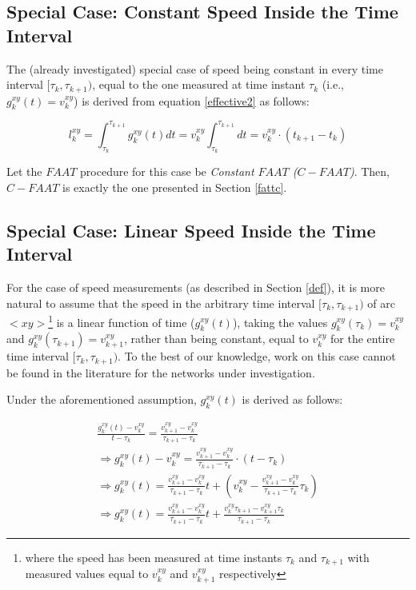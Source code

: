 \documentclass[conference]{IEEEtran}
\begin{document}
\subsection{Special Case: Constant Speed Inside the Time Interval} 

The (already investigated) special case of speed being constant in every time interval $[\tau_k, \tau_{k+1})$, equal to the one measured at time instant $\tau_k$ (i.e., $g_k^{xy}(t)=v_k^{xy}$) is derived from equation \ref{effective2} as follows:

\begin{equation}
    l_k^{xy}=\int_{\tau_k}^{\tau_{k+1}}g_k^{xy}(t)dt=v_k^{xy} \int_{\tau_k}^{\tau_{k+1}}dt=v_k^{xy}\cdot(t_{k+1}-t_k)    \label{effective3}
\end{equation}

Let the $FAAT$ procedure for this case be \emph{Constant $FAAT$ ($C-FAAT$)}. Then, $C-FAAT$ is exactly the one presented in Section \ref{fattc}. 

\subsection{Special Case: Linear Speed Inside the Time Interval} 

For the case of speed measurements (as described in Section \ref{def}), it is more natural to assume that the speed in the arbitrary time interval $[\tau_k, \tau_{k+1})$ of arc $<xy>$\footnote{where the speed has been measured at time instants $\tau_k$ and $\tau_{k+1}$ with measured values equal to $v_k^{xy}$ and $v_{k+1}^{xy}$ respectively} is a linear function of time ($g_k^{xy}(t)$), taking the values $g_k^{xy}(\tau_k)=v_k^{xy}$ and $g_k^{xy}(\tau_{k+1})=v_{k+1}^{xy}$, rather than being constant, equal to $v_k^{xy}$ for the entire time interval $[\tau_k, \tau_{k+1})$. To the best of our knowledge, work on this case cannot be found in the literature for the networks under investigation.

Under the aforementioned assumption, $g_k^{xy}(t)$ is derived as follows:


\begin{eqnarray}
    &\frac{g_k^{xy}(t)-v_k^{xy}}{t-\tau_k}=\frac{v_{k+1}^{xy}-v_k^{xy}}{\tau_{k+1}-\tau_k}&  \\ 
    &\Rightarrow  g_k^{xy}(t)-v_k^{xy}=\frac{v_{k+1}^{xy}-v_k^{xy}}{\tau_{k+1}-\tau_k} \cdot(t-\tau_k)& \nonumber \\
&\Rightarrow g_k^{xy}(t)=\frac{v_{k+1}^{xy}-v_k^{xy}}{\tau_{k+1}-\tau_k}t+(v_k^{xy}-\frac{v_{k+1}^{xy}-v_k^{xy}}{\tau_{k+1}-\tau_k}\tau_k)&  \nonumber \\ 
&\Rightarrow g_k^{xy}(t)=\frac{v_{k+1}^{xy}-v_k^{xy}}{\tau_{k+1}-\tau_k}t+
            \frac{v_{k}^{xy}\tau_{k+1}-v_{k+1}^{xy}\tau_{k}}{\tau_{k+1}-\tau_k}&      
\end{eqnarray}
\end{document}
